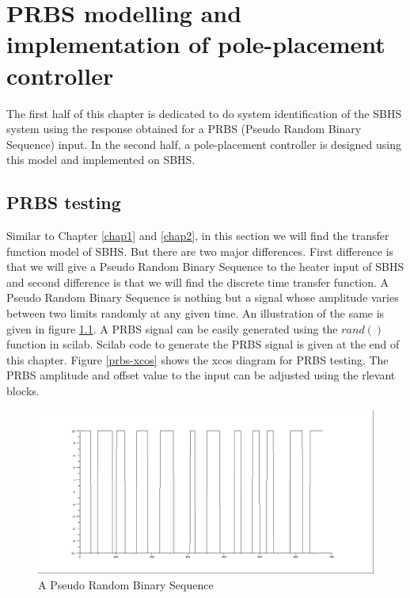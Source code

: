 \chapter{PRBS modelling and implementation of pole-placement controller}
The first half of this chapter is dedicated to do system identification of the SBHS system using the response obtained for a PRBS (Pseudo Random Binary Sequence) input. In the second half, a pole-placement controller is designed using this model and implemented on SBHS.


\section{PRBS testing}

Similar to Chapter \ref{chap1} and \ref{chap2}, in this section we will find the transfer function model of SBHS. But there are two major differences. First difference is that we will give a Pseudo Random Binary Sequence to the heater input of SBHS and second difference is that we will find the discrete time transfer function. A Pseudo Random Binary Sequence is nothing but a signal whose amplitude varies between two limits randomly at any given time. An illustration of the same is given in figure \ref{prbs-fig}. A PRBS signal can be easily generated using the $rand()$ function in scilab. Scilab code to generate the PRBS signal is given at the end of this chapter. Figure \ref{prbs-xcos} shows the xcos diagram for PRBS testing. The PRBS amplitude and offset value to the input can be adjusted using the rlevant blocks.
\begin{figure}
\centering
\includegraphics[width=0.7\linewidth]{prbs/prbs-illustration.png}
\caption{A Pseudo Random Binary Sequence}
\label{prbs-fig}
\end{figure}

